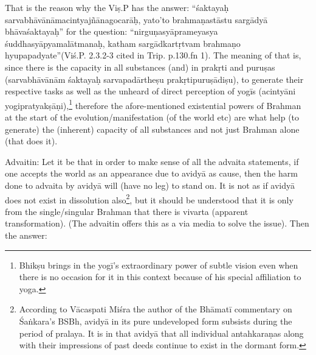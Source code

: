 That is the reason why the Viṣ.P has the answer: “śaktayaḥ sarvabhāvānāmacintyajñānagocarāḥ, yato’to brahmaṇastāstu sargādyā bhāvaśaktayaḥ” for the question: “nirguṇasyāprameyasya śuddhasyāpyamalātmanaḥ, katham sargādkartṛtvam brahmaṇo hyupapadyate”\break (Viś.P. 2.3.2-3 cited in Trip. p.130.fn 1). The meaning of that is, since there is the capacity in all substances (and) in prakṛti and puruṣas (sarvabhāvānām śaktayaḥ sarvapadārtheṣu prakṛtipuruṣādiṣu), to generate their respective tasks as well as the unheard of direct perception of yogīs (acintyāni yogipratyakṣāṇi),\footnote{Bhikṣu brings in the yogī’s extraordinary power of subtle vision even when there is no occasion for it in this context because of his special affiliation to yoga.} therefore the afore-mentioned existential powers of Brahman at the start of the evolution/manifesta\-tion (of the world etc) are what help (to generate) the (inherent) capacity of all substances and not just Brahman alone (that does it).

\vskip 4pt


\vskip 4pt

Advaitin: Let it be that in order to make sense of all the advaita statements, if one accepts the world as an appearance due to avidyā as cause, then the harm done to advaita by avidyā will (have no leg) to stand on. It is not as if avidyā does not exist in dissolution also\footnote{According to Vācaspati Miśra the author of the Bhāmatī commentary on Śaṅkara’s BSBh, avidyā in its pure undeveloped form subsists during the period of pralaya. It is in that avidyā that all individual antahkaraṇas along with their impressions of past deeds continue to exist in the dormant form.}, but it should be understood that it is only from the single/singular Brahman that there is vivarta (apparent transformation). (The advaitin offers this as a via media to solve the issue). Then the answer:

